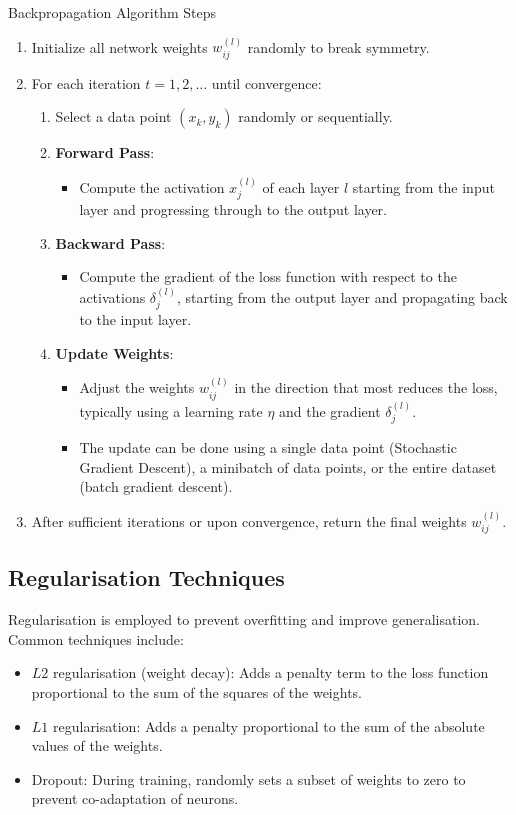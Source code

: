 \begin{definitionbox}{Backpropagation Algorithm Steps}
\begin{enumerate}
    \item Initialize all network weights \( w_{ij}^{(l)} \) randomly to break symmetry.
    \item For each iteration \( t = 1, 2, \ldots \) until convergence:
    \begin{enumerate}
        \item Select a data point \( (x_k, y_k) \) randomly or sequentially.
        \item \textbf{Forward Pass}:
        \begin{itemize}
            \item Compute the activation \( x_j^{(l)} \) of each layer \( l \) starting from the input layer and progressing through to the output layer.
        \end{itemize}
        \item \textbf{Backward Pass}:
        \begin{itemize}
            \item Compute the gradient of the loss function with respect to the activations \( \delta_j^{(l)} \), starting from the output layer and propagating back to the input layer.
        \end{itemize}
        \item \textbf{Update Weights}:
        \begin{itemize}
            \item Adjust the weights \( w_{ij}^{(l)} \) in the direction that most reduces the loss, typically using a learning rate \( \eta \) and the gradient \( \delta_j^{(l)} \).
            \item The update can be done using a single data point (Stochastic Gradient Descent), a minibatch of data points, or the entire dataset (batch gradient descent).
        \end{itemize}
    \end{enumerate}
    \item After sufficient iterations or upon convergence, return the final weights \( w_{ij}^{(l)} \).
\end{enumerate}
\end{definitionbox}

\subsection*{Regularisation Techniques}
Regularisation is employed to prevent overfitting and improve generalisation. Common techniques include:
\begin{itemize}
    \item \( L2 \) regularisation (weight decay): Adds a penalty term to the loss function proportional to the sum of the squares of the weights.
    \item \( L1 \) regularisation: Adds a penalty proportional to the sum of the absolute values of the weights.
    \item Dropout: During training, randomly sets a subset of weights to zero to prevent co-adaptation of neurons.
\end{itemize}

